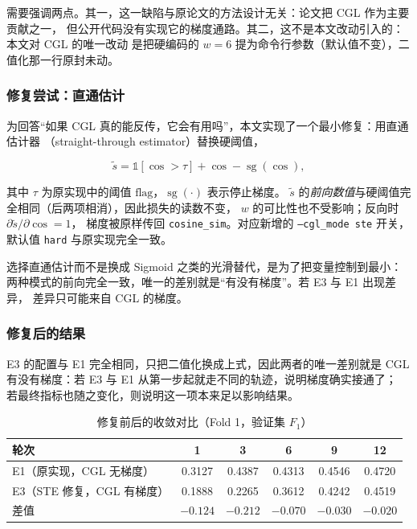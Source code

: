 需要强调两点。其一，这一缺陷与原论文的方法设计无关：论文把 CGL 作为主要贡献之一，
但公开代码没有实现它的梯度通路。其二，这不是本文改动引入的：本文对 CGL 的唯一改动
是把硬编码的 $w=6$ 提为命令行参数（默认值不变），二值化那一行原封未动。

\subsubsection{修复尝试：直通估计}

为回答“如果 CGL 真的能反传，它会有用吗”，本文实现了一个最小修复：用直通估计器
（straight-through estimator）替换硬阈值，

\begin{equation}
\tilde{s} = \mathbb{1}\left[\cos > \tau\right] + \cos - \operatorname{sg}(\cos),
\end{equation}

其中 $\tau$ 为原实现中的阈值 $\mathrm{flag}$，$\operatorname{sg}(\cdot)$ 表示停止梯度。
$\tilde{s}$ 的\emph{前向数值}与硬阈值完全相同（后两项相消），因此损失的读数不变，
$w$ 的可比性也不受影响；反向时 $\partial \tilde{s} / \partial \cos = 1$，
梯度被原样传回 \texttt{cosine\_sim}。对应新增的 \texttt{--cgl\_mode ste} 开关，
默认值 \texttt{hard} 与原实现完全一致。

选择直通估计而不是换成 Sigmoid 之类的光滑替代，是为了把变量控制到最小：
两种模式的前向完全一致，唯一的差别就是“有没有梯度”。若 E3 与 E1 出现差异，
差异只可能来自 CGL 的梯度。

\subsubsection{修复后的结果}

E3 的配置与 E1 完全相同，只把二值化换成上式，因此两者的唯一差别就是
CGL 有没有梯度：若 E3 与 E1 从第一步起就走不同的轨迹，说明梯度确实接通了；
若最终指标也随之变化，则说明这一项本来足以影响结果。

\begin{table}[H]
\centering
\caption{修复前后的收敛对比（Fold 1，验证集 $F_1$）}
\label{tab:ste_curve}
\small
\setlength{\tabcolsep}{6pt}
\begin{tabular}{lccccc}
\toprule
轮次 & 1 & 3 & 6 & 9 & 12\\
\midrule
E1（原实现，CGL 无梯度） & 0.3127 & 0.4387 & 0.4313 & 0.4546 & 0.4720\\
E3（STE 修复，CGL 有梯度） & 0.1888 & 0.2265 & 0.3612 & 0.4242 & 0.4519\\
\midrule
差值 & $-0.124$ & $-0.212$ & $-0.070$ & $-0.030$ & $-0.020$\\
\bottomrule
\end{tabular}
\end{table}

